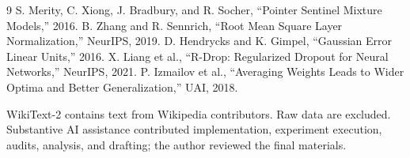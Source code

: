 \documentclass[10pt,a4paper]{article}
\begin{document}
\begin{thebibliography}{9}
 S. Merity, C. Xiong, J. Bradbury, and R. Socher, ``Pointer Sentinel Mixture Models,'' 2016.
 B. Zhang and R. Sennrich, ``Root Mean Square Layer Normalization,'' NeurIPS, 2019.
 D. Hendrycks and K. Gimpel, ``Gaussian Error Linear Units,'' 2016.
 X. Liang et al., ``R-Drop: Regularized Dropout for Neural Networks,'' NeurIPS, 2021.
 P. Izmailov et al., ``Averaging Weights Leads to Wider Optima and Better Generalization,'' UAI, 2018.
\end{thebibliography}

\small WikiText-2 contains text from Wikipedia contributors. Raw data are excluded. Substantive AI assistance contributed implementation, experiment execution, audits, analysis, and drafting; the author reviewed the final materials.
\end{document}
